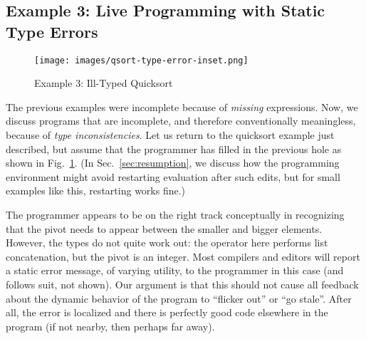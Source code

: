 

\subsection{Example 3: Live Programming with Static Type Errors}
\label{sec:static-errors}


\begin{figure}
\centering
\texttt{[image: images/qsort-type-error-inset.png]}
\vspace{2px}
\caption{Example 3: Ill-Typed Quicksort}
\label{fig:qsort-type-error}
\vspace{-4px}
\end{figure}


The previous examples were incomplete 
because of \emph{missing} expressions.
%
Now, we discuss programs that are incomplete, 
and therefore conventionally meaningless, because of
\emph{type inconsistencies}. 
%
Let us return to the quicksort example just described, 
but assume that the programmer has filled in the previous hole
as shown in Fig.~\ref{fig:qsort-type-error}. (In Sec.~\ref{sec:resumption}, we discuss
how the programming environment might avoid restarting evaluation after such edits, but for small examples like this, restarting works fine.)

The programmer appears to be on the right track conceptually
in recognizing that the pivot needs to appear between the 
smaller and bigger elements. 
However, the types do not quite work out: the  operator here
performs list concatenation, but the pivot is an integer. 
Most compilers and editors will report a static error message, 
of varying utility, to the programmer in this case (and \Hazel 
follows suit, not shown). 
Our argument is that this should not cause all feedback about 
the dynamic behavior of the program to ``flicker out'' or ``go stale''. After all,
the error is localized and there is perfectly good code elsewhere 
in the program (if not nearby, then perhaps far away).

